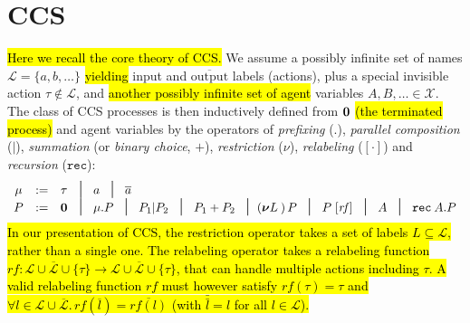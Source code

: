 
\section{CCS}
\label{ss:ccs}

\hl{Here we recall the core theory of CCS.}
We assume a possibly infinite set of names $\mathscr{L} = \{a, b,
\ldots\}$ \hl{yielding} input and $\overline{\mbox{output}}$ labels (actions), plus a special invisible
action $\tau \notin \mathscr{L}$, and \hl{another possibly infinite
  set of agent} variables $A, B,
\ldots \in \mathscr{X}$.
The class of CCS processes is then inductively
defined from ${\boldsymbol 0}$ \hl{(the terminated process)} and agent variables by the operators
of \emph{prefixing} (.), \emph{parallel composition} ($|$),
\emph{summation}
(or \emph{binary choice}, $+$),
\emph{restriction} ($\nu$), \emph{relabeling} ($[\cdot]$) and
\emph{recursion} ($\texttt{rec}$):
\begin{equation*}
\begin{array}{cccl}
\mu  & := & \tau\!\!\!\! & \midd \; a  \; \midd \;  \outC a  \\
P  & := & \nil\!\!\!\! & \midd \;  \mu . P \; \midd \;  P_1 |  P_2 \; \midd  \;
P_1 + P_2 \; \midd 
(\res L)\, P
\; \midd \; P\; [\mathit{rf}]  %
\;  \midd \;  A \; \midd \; \recu A  P
\end{array}
\end{equation*}
\hl{In our presentation of CCS, 
the restriction operator takes a set of  labels $L
    \subseteq \mathscr{L}$, rather than a single one.  
The relabeling operator takes a relabeling function
    $\mathit{rf} \colon \mathscr{L} \cup \overline{\mathscr{L}} \cup
    \{\tau\} \rightarrow \mathscr{L} \cup \overline{\mathscr{L}} \cup
    \{\tau\}$, that can  handle multiple actions including $\tau$. A valid
    relabeling function $\mathit{rf}$ must however 
satisfy $\mathit{rf}(\tau) =
    \tau$ and $\forall l\in\mathscr{L} \cup \overline{\mathscr{L}}.\, \mathit{rf}(\overline{l}) =
    \overline{\mathit{rf}(l)}$ (with $\bar{\bar l} = l$ for all $l \in
    \mathscr{L}$).}
